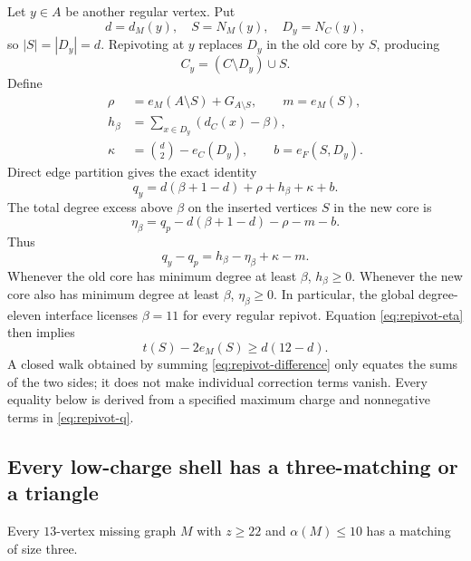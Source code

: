 Let $y\in A$ be another regular vertex. Put
\[
d=d_M(y),\quad S=N_M(y),\quad D_y=N_C(y),
\]
so $|S|=|D_y|=d$. Repivoting at $y$ replaces $D_y$ in the old core by $S$, producing
\[
C_y=(C\setminus D_y)\cup S.
\]
Define
\[
\begin{split}
\rho&=e_M(A\setminus S)+G_{A\setminus S},\qquad
m=e_M(S),\\
h_\beta&=\sum_{x\in D_y}(d_C(x)-\beta),\\
\kappa&=\binom d2-e_C(D_y),\qquad
b=e_F(S,D_y).
\end{split}
\]
Direct edge partition gives the exact identity
\begin{equation}
q_y=d(\beta+1-d)+\rho+h_\beta+\kappa+b.
\label{eq:repivot-q}
\end{equation}
The total degree excess above $\beta$ on the inserted vertices $S$ in the new core is
\begin{equation}
\eta_\beta=q_p-d(\beta+1-d)-\rho-m-b.
\label{eq:repivot-eta}
\end{equation}
Thus
\begin{equation}
q_y-q_p=h_\beta-\eta_\beta+\kappa-m.
\label{eq:repivot-difference}
\end{equation}
Whenever the old core has minimum degree at least $\beta$, $h_\beta\geq0$. Whenever the new core also has minimum degree at least $\beta$, $\eta_\beta\geq0$. In particular, the global degree-eleven interface licenses $\beta=11$ for every regular repivot. Equation \eqref{eq:repivot-eta} then implies
\begin{equation}
t(S)-2e_M(S)\geq d(12-d).
\label{eq:INS11}
\end{equation}
A closed walk obtained by summing \eqref{eq:repivot-difference} only equates the sums of the two sides; it does not make individual correction terms vanish. Every equality below is derived from a specified maximum charge and nonnegative terms in \eqref{eq:repivot-q}.

\subsection{Every low-charge shell has a three-matching or a triangle}

\begin{lemma}
\label{lem:matching13}
Every $13$-vertex missing graph $M$ with $z\geq22$ and $\alpha(M)\leq10$ has a matching of size three.
\end{lemma}

